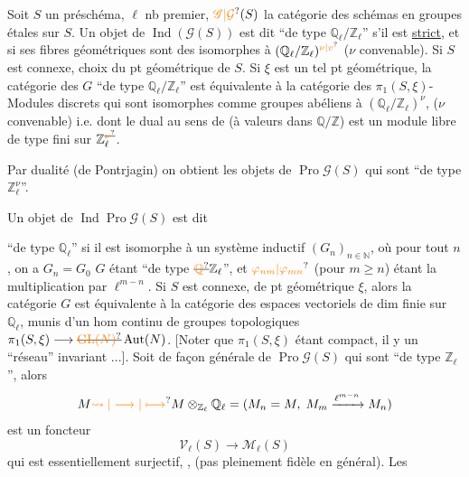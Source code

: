 Soit $S$ un préschéma, $\ell$ nb premier,   $\unsure{\mathscr G|\mathcal G}(S)$ la catégorie des schémas en groupes  étales sur $S$. Un objet de $\operatorname{Ind}(\mathscr G(S))$ est dit ``de type $\mathbb Q_\ell/\mathbb Z_\ell$'' s'il est \uline{strict}, et si ses fibres géométriques sont des  isomorphes à $(\mathbb Q_\ell/\mathbb Z_\ell)^{\unsure{\nu|v}}$ ($\nu$ convenable). Si $S$ est connexe,   choix du pt géométrique de $S$. Si $\xi$ est un tel pt géométrique, la  catégorie des  $G$ ``de type $\mathbb Q_\ell/\mathbb Z_\ell$'' est  équivalente à la catégorie des \deleted{\unsure{$\xi$}} $\pi_1(S,\xi)$-Modules discrets qui sont isomorphes comme groupes abéliens à $(\mathbb Q_\ell/\mathbb Z_\ell)^\nu$,  ($\nu$ convenable) i.e. dont le dual au sens de  (à valeurs dans $\mathbb Q/\mathbb Z$) est  un module libre de type fini sur $\mathbb Z_\ell^{\deleted{\unsure{\nu}}}$.

Par dualité (de Pontrjagin) on obtient les objets de $\operatorname{Pro}\mathscr G(S)$ qui sont ``de type $\mathbb Z_\ell^\nu$''.

Un objet de $\operatorname{Ind}\operatorname{Pro}\mathscr G(S)$ est dit

``de type $\mathbb Q_\ell$'' si il est isomorphe à un  système inductif $(G_n)_{n\in\mathbb N}$, où pour tout $n$, on a $G_n=G_0$ $G$ étant ``de type $\deleted{\unsure{\mathbb Q}}\mathbb Z_\ell$'', et $\unsure{\varphi_{nm}|\varphi_{mn}}$ (pour $m\geq n$) étant la multiplication par $\ell^{m-n}$. Si $S$ est connexe, de pt géométrique $\xi$, alors la catégorie   $G$ est équivalente à la catégorie des espaces vectoriels  de dim finie sur $\mathbb Q_\ell$, munis d'un hom continu de groupes topologiques $\pi_1(S,\xi)\longrightarrow\deleted{\unsure{\operatorname{GL}(N)}}\operatorname{Aut}(N)$. [Noter que $\pi_1(S,\xi)$ étant compact, il y  un ``réseau'' invariant ...]. Soit de façon générale   de $\operatorname{Pro}\mathscr G(S)$ qui sont ``de type $\mathbb Z_\ell$'', alors 
\[
M\unsure{\rightsquigarrow|\longrightarrow|\longmapsto}M\otimes_{\mathbb Z_\ell}\mathbb Q_\ell=(M_n=M,\;M_m\xrightarrow{\ell^{m-n}}M_n)
\]
est un foncteur
\[
\mathcal V_\ell(S)\longrightarrow\mathcal M_\ell(S)
\]
qui est essentiellement surjectif, , (pas pleinement fidèle en général). Les

